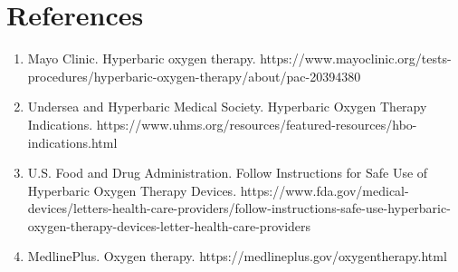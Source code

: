 \section*{References}
\begin{enumerate}
  \item Mayo Clinic. Hyperbaric oxygen therapy. https://www.mayoclinic.org/tests-procedures/hyperbaric-oxygen-therapy/about/pac-20394380
  \item Undersea and Hyperbaric Medical Society. Hyperbaric Oxygen Therapy Indications. https://www.uhms.org/resources/featured-resources/hbo-indications.html
  \item U.S. Food and Drug Administration. Follow Instructions for Safe Use of Hyperbaric Oxygen Therapy Devices. https://www.fda.gov/medical-devices/letters-health-care-providers/follow-instructions-safe-use-hyperbaric-oxygen-therapy-devices-letter-health-care-providers
  \item MedlinePlus. Oxygen therapy. https://medlineplus.gov/oxygentherapy.html
\end{enumerate}

\clearpage
